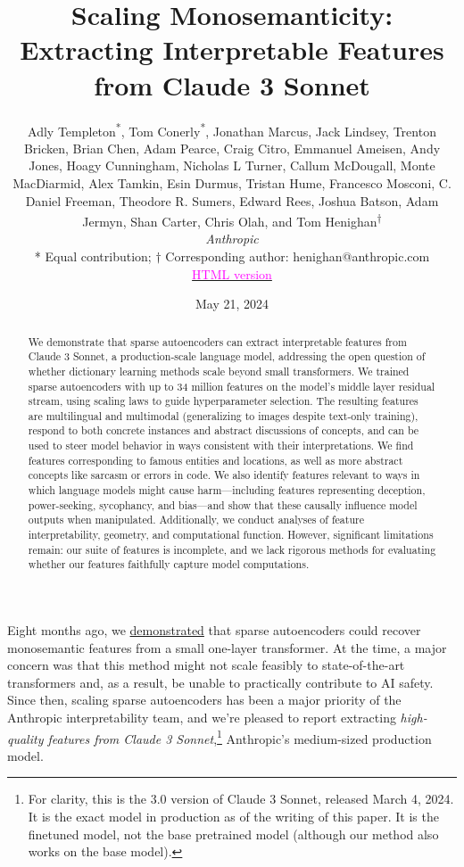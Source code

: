 \documentclass{article}
\title{Scaling Monosemanticity: Extracting Interpretable Features from Claude 3 Sonnet}
\author{\parbox{0.9\textwidth}{\centering Adly Templeton\textsuperscript{*}, Tom Conerly\textsuperscript{*}, Jonathan Marcus, Jack Lindsey, Trenton Bricken, Brian Chen, Adam Pearce, Craig Citro, Emmanuel Ameisen, Andy Jones, Hoagy Cunningham, Nicholas L Turner, Callum McDougall, Monte MacDiarmid, Alex Tamkin, Esin Durmus, Tristan Hume, Francesco Mosconi, C. Daniel Freeman, Theodore R. Sumers, Edward Rees, Joshua Batson, Adam Jermyn, Shan Carter, Chris Olah, and Tom Henighan\textsuperscript{$\dagger$} \\[0.5em]
\textit{Anthropic} \\[0.3em]
\footnotesize{* Equal contribution; $\dagger$ Corresponding author: henighan@anthropic.com} \\[0.5em]
\href{https://transformer-circuits.pub/2024/scaling-monosemanticity/index.html}{\textcolor{magenta}{HTML version}}}}
\date{May 21, 2024}
\begin{document}
\maketitle

\begin{abstract}
We demonstrate that sparse autoencoders can extract interpretable features from Claude 3 Sonnet, a production-scale language model, addressing the open question of whether dictionary learning methods scale beyond small transformers. We trained sparse autoencoders with up to 34 million features on the model's middle layer residual stream, using scaling laws to guide hyperparameter selection. The resulting features are multilingual and multimodal (generalizing to images despite text-only training), respond to both concrete instances and abstract discussions of concepts, and can be used to steer model behavior in ways consistent with their interpretations. We find features corresponding to famous entities and locations, as well as more abstract concepts like sarcasm or errors in code. We also identify features relevant to ways in which language models might cause harm—including features representing deception, power-seeking, sycophancy, and bias—and show that these causally influence model outputs when manipulated.  Additionally, we conduct analyses of feature interpretability, geometry, and computational function. However, significant limitations remain: our suite of features is incomplete, and we lack rigorous methods for evaluating whether our features faithfully capture model computations.
\end{abstract}

Eight months ago, we \href{https://transformer-circuits.pub/2023/monosemantic-features/index.html}{demonstrated} that sparse autoencoders could recover monosemantic features from a small one-layer transformer. At the time, a major concern was that this method might not scale feasibly to state-of-the-art transformers and, as a result, be unable to practically contribute to AI safety. Since then, scaling sparse autoencoders has been a major priority of the Anthropic interpretability team, and we're pleased to report extracting \textit{high-quality features from Claude 3 Sonnet},\footnote{For clarity, this is the 3.0 version of Claude 3 Sonnet, released March 4, 2024. It is the exact model in production as of the writing of this paper. It is the finetuned model, not the base pretrained model (although our method also works on the base model).} Anthropic's medium-sized production model.
\end{document}
